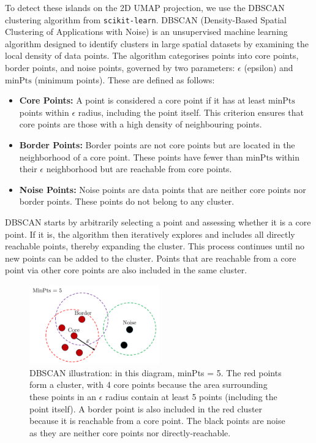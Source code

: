 \documentclass[draft, a4paper,12pt]{article}
\begin{document}
To detect these islands on the 2D UMAP projection, we use the DBSCAN clustering algorithm \cite{dbscan} from \verb|scikit-learn|. DBSCAN (Density-Based Spatial Clustering of Applications with Noise) is an unsupervised machine learning algorithm designed to identify clusters in large spatial datasets by examining the local density of data points. The algorithm categorises points into core points, border points, and noise points, governed by two parameters: $\epsilon$ (epsilon) and $\text{minPts}$ (minimum points). These are defined as follows:
\begin{itemize}
    \item \textbf{Core Points:} A point is considered a core point if it has at least $\text{minPts}$ points within $\epsilon$ radius, including the point itself. This criterion ensures that core points are those with a high density of neighbouring points.

    \item \textbf{Border Points:} Border points are not core points but are located in the neighborhood of a core point. These points have fewer than $\text{minPts}$ within their $\epsilon$ neighborhood but are reachable from core points.

    \item \textbf{Noise Points:} Noise points are data points that are neither core points nor border points. These points do not belong to any cluster.
\end{itemize}
DBSCAN starts by arbitrarily selecting a point and assessing whether it is a core point. If it is, the algorithm then iteratively explores and includes all directly reachable points, thereby expanding the cluster. This process continues until no new points can be added to the cluster. Points that are reachable from a core point via other core points are also included in the same cluster.
\begin{figure}[H]
    \centering
    \includegraphics[width=0.5\textwidth]{../figures/dbscan_diagram.png}
    \caption{DBSCAN illustration: in this diagram, minPts = 5. 
    The red points form a cluster, with 4 core points because the area surrounding these points in an $\epsilon$ radius contain at least 5 points (including the point itself). A border point is also included in the red cluster because it is reachable from a core point. The black points are noise as they are neither core points nor directly-reachable.}
    \label{fig:dbscan}
\end{figure}
\end{document}

